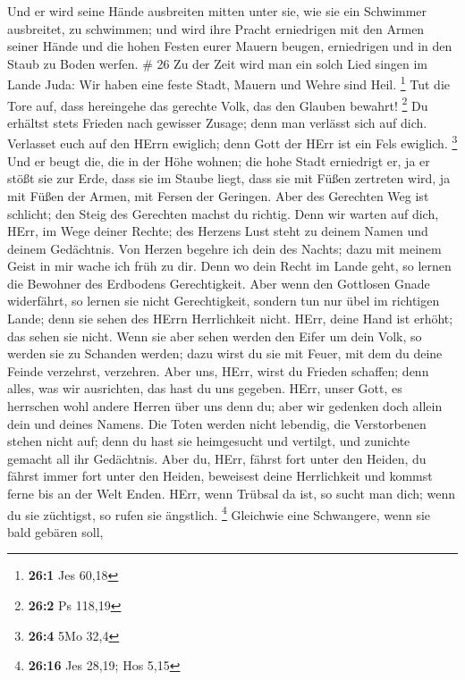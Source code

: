  Und er wird seine Hände ausbreiten mitten unter sie, wie
sie ein Schwimmer ausbreitet, zu schwimmen; und wird ihre Pracht
erniedrigen mit den Armen seiner Hände  und die hohen
Festen eurer Mauern beugen, erniedrigen und in den Staub zu Boden
werfen. \# 26  Zu der Zeit wird man ein solch Lied singen im
Lande Juda: Wir haben eine feste Stadt, Mauern und Wehre sind Heil.
\footnote{\textbf{26:1} Jes 60,18}  Tut die Tore auf, dass
hereingehe das gerechte Volk, das den Glauben bewahrt! \footnote{\textbf{26:2}
  Ps 118,19}  Du erhältst stets Frieden nach gewisser
Zusage; denn man verlässt sich auf dich.  Verlasset euch auf
den HErrn ewiglich; denn Gott der HErr ist ein Fels ewiglich.
\footnote{\textbf{26:4} 5Mo 32,4}  Und er beugt die, die in
der Höhe wohnen; die hohe Stadt erniedrigt er, ja er stößt sie zur Erde,
dass sie im Staube liegt,  dass sie mit Füßen zertreten
wird, ja mit Füßen der Armen, mit Fersen der Geringen.  Aber
des Gerechten Weg ist schlicht; den Steig des Gerechten machst du
richtig.  Denn wir warten auf dich, HErr, im Wege deiner
Rechte; des Herzens Lust steht zu deinem Namen und deinem Gedächtnis.
 Von Herzen begehre ich dein des Nachts; dazu mit meinem
Geist in mir wache ich früh zu dir. Denn wo dein Recht im Lande geht, so
lernen die Bewohner des Erdbodens Gerechtigkeit.  Aber wenn
den Gottlosen Gnade widerfährt, so lernen sie nicht Gerechtigkeit,
sondern tun nur übel im richtigen Lande; denn sie sehen des HErrn
Herrlichkeit nicht.  HErr, deine Hand ist erhöht; das sehen
sie nicht. Wenn sie aber sehen werden den Eifer um dein Volk, so werden
sie zu Schanden werden; dazu wirst du sie mit Feuer, mit dem du deine
Feinde verzehrst, verzehren.  Aber uns, HErr, wirst du
Frieden schaffen; denn alles, was wir ausrichten, das hast du uns
gegeben.  HErr, unser Gott, es herrschen wohl andere Herren
über uns denn du; aber wir gedenken doch allein dein und deines Namens.
 Die Toten werden nicht lebendig, die Verstorbenen stehen
nicht auf; denn du hast sie heimgesucht und vertilgt, und zunichte
gemacht all ihr Gedächtnis.  Aber du, HErr, fährst fort
unter den Heiden, du fährst immer fort unter den Heiden, beweisest deine
Herrlichkeit und kommst ferne bis an der Welt Enden.  HErr,
wenn Trübsal da ist, so sucht man dich; wenn du sie züchtigst, so rufen
sie ängstlich. \footnote{\textbf{26:16} Jes 28,19; Hos 5,15}
 Gleichwie eine Schwangere, wenn sie bald gebären soll,
